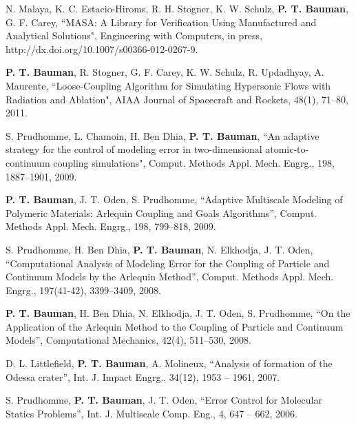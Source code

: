 %
N. Malaya, K. C. Estacio-Hiroms, R. H. Stogner, K. W. Schulz, \textbf{P. T. Bauman}, G. F. Carey, ``MASA: A Library for Verification Using Manufactured and Analytical Solutions", Engineering with Computers, in press, http://dx.doi.org/10.1007/s00366-012-0267-9.

\blankline

\textbf{P. T. Bauman}, R. Stogner, G. F. Carey, K. W. Schulz, R. Updadhyay, A. Maurente, ``Loose-Coupling Algorithm for Simulating 
Hypersonic Flows with Radiation and Ablation", AIAA Journal of Spacecraft and Rockets, 48(1), 71--80, 2011.

\blankline

S. Prudhomme, L. Chamoin, H. Ben Dhia, \textbf{P. T. Bauman}, ``An adaptive strategy for the control of modeling error in two-dimensional atomic-to-continuum coupling simulations", Comput. Methods Appl. Mech. Engrg., 198, 1887--1901, 2009.

\blankline

\textbf{P. T. Bauman}, J. T. Oden, S. Prudhomme, ``Adaptive Multiscale Modeling of Polymeric Materials: Arlequin Coupling and Goals Algorithms'', Comput. Methods Appl. Mech. Engrg., 198, 799--818, 2009.
 
\blankline

S. Prudhomme, H. Ben Dhia, \textbf{P. T. Bauman}, N. Elkhodja, J. T. Oden, ``Computational Analysis of Modeling Error for the Coupling of Particle and Continuum Models by the Arlequin Method'', Comput. Methods Appl. Mech. Engrg., 197(41-42), 3399--3409, 2008.

\blankline

\textbf{P. T. Bauman}, H. Ben Dhia, N. Elkhodja, J. T. Oden, S. Prudhomme, ``On the Application of the Arlequin Method to the Coupling of Particle and Continuum Models'', Computational Mechanics, 42(4), 511--530, 2008.

\blankline


D. L. Littlefield, \textbf{P. T. Bauman}, A. Molineux, ``Analysis of formation of the Odessa crater'', Int. J. Impact Engrg., 34(12), 1953 -- 1961, 2007.

\blankline

S. Prudhomme, \textbf{P. T. Bauman}, J. T. Oden, ``Error Control for Molecular Statics Problems'', Int. J. Multiscale Comp. Eng., 4, 647 -- 662, 2006.

